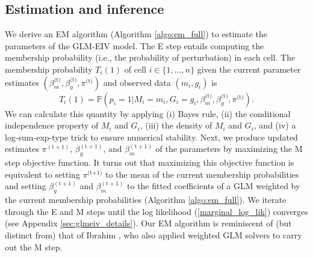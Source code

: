 \documentclass[12pt]{article}
\begin{document}
\subsection{Estimation and inference}\label{sec:estimation_inference}
We derive an EM algorithm (Algorithm \ref{algo:em_full}) to estimate the parameters of the GLM-EIV model. The E step entails computing the membership probability (i.e., the probability of perturbation) in each cell. The membership probability $T_i(1)$ of cell $i \in \{1, \dots, n\}$ given the current parameter estimates $(\beta_m^\textrm{(t)}, \beta_g^\textrm{(t)}, \pi^\textrm{(t)})$ and observed data $(m_i, g_i)$ is
$$T_i(1) = \mathbb{P}(p_i = 1| M_i = m_i, G_i = g_i, \beta^\textrm{(t)}_m, \beta^\textrm{(t)}_g, \pi^\textrm{(t)}).$$ We can calculate this quantity by applying (i) Bayes rule, (ii) the conditional independence property of $M_i$ and $G_i$, (iii) the density of $M_i$ and $G_i$, and (iv) a log-sum-exp-type trick to ensure numerical stability. Next, we produce updated estimates $\pi^{(\textrm{t} +1)}$, $\beta_g^{(\textrm{t}+1)}$, and $\beta_m^{(\textrm{t}+1)}$ of the parameters by maximizing the M step objective function. It turns out that maximizing this objective function is equivalent to setting $\pi^{\textrm{(t+1)}}$ to the mean of the current membership probabilities and setting $\beta_g^{(\textrm{t}+1)}$ and $\beta_m^{(\textrm{t}+1)}$ to the fitted coefficients of a GLM weighted by the current membership probabilities (Algorithm \ref{algo:em_full}). We iterate through the E and M steps until the log likelihood (\ref{marginal_log_lik}) converges (see Appendix \ref{sec:glmeiv_details}). Our EM algorithm is reminiscent of (but distinct from) that of Ibrahim  \parencite{Ibrahim1990}, who also applied weighted GLM solvers to carry out the M step.
\end{document}
